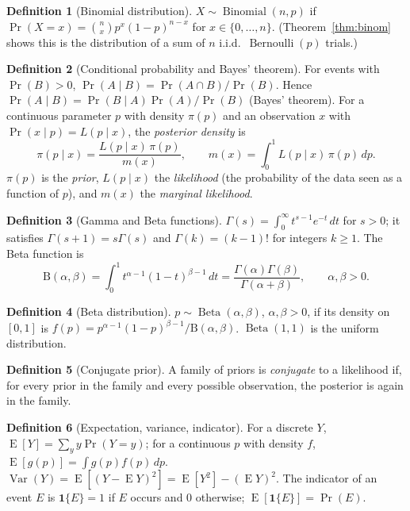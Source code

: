 \documentclass[11pt]{article}
\theoremstyle{definition}
\newtheorem{definition}{Definition}
\theoremstyle{remark}
\renewcommand{\Pr}{\operatorname{Pr}}
\newcommand{\E}{\operatorname{E}}
\newcommand{\Var}{\operatorname{Var}}
\newcommand{\Bin}{\operatorname{Binomial}}
\newcommand{\Ber}{\operatorname{Bernoulli}}
\newcommand{\Betad}{\operatorname{Beta}}
\newcommand{\Bfun}{\mathrm{B}}
\newcommand{\ind}[1]{\mathbf{1}\{#1\}}
\begin{document}
\begin{definition}[Binomial distribution]
$X\sim\Bin(n,p)$ if $\Pr(X=x)=\binom nx p^x(1-p)^{n-x}$ for $x\in\{0,\dots,n\}$.
(Theorem~\ref{thm:binom} shows this is the distribution of a sum of $n$ i.i.d.\ $\Ber(p)$ trials.)
\end{definition}

\begin{definition}[Conditional probability and Bayes' theorem]
For events with $\Pr(B)>0$, $\Pr(A\mid B)=\Pr(A\cap B)/\Pr(B)$. Hence
$\Pr(A\mid B)=\Pr(B\mid A)\Pr(A)/\Pr(B)$ (Bayes' theorem). For a continuous parameter $p$
with density $\pi(p)$ and an observation $x$ with $\Pr(x\mid p)=L(p\mid x)$, the
\emph{posterior density} is
\[
\pi(p\mid x)=\frac{L(p\mid x)\,\pi(p)}{m(x)},\qquad m(x)=\int_0^1 L(p\mid x)\,\pi(p)\,dp .
\]
$\pi(p)$ is the \emph{prior}, $L(p\mid x)$ the \emph{likelihood} (the probability of the data seen as a
function of $p$), and $m(x)$ the \emph{marginal likelihood}.
\end{definition}

\begin{definition}[Gamma and Beta functions]
$\Gamma(s)=\int_0^\infty t^{s-1}e^{-t}\,dt$ for $s>0$; it satisfies $\Gamma(s+1)=s\Gamma(s)$ and
$\Gamma(k)=(k-1)!$ for integers $k\ge1$. The Beta function is
\[
\Bfun(\alpha,\beta)=\int_0^1 t^{\alpha-1}(1-t)^{\beta-1}\,dt=\frac{\Gamma(\alpha)\Gamma(\beta)}{\Gamma(\alpha+\beta)},
\qquad \alpha,\beta>0 .
\]
\end{definition}

\begin{definition}[Beta distribution]
$p\sim\Betad(\alpha,\beta)$, $\alpha,\beta>0$, if its density on $[0,1]$ is
$f(p)=p^{\alpha-1}(1-p)^{\beta-1}/\Bfun(\alpha,\beta)$. $\Betad(1,1)$ is the uniform distribution.
\end{definition}

\begin{definition}[Conjugate prior]
A family of priors is \emph{conjugate} to a likelihood if, for every prior in the family and every
possible observation, the posterior is again in the family.
\end{definition}

\begin{definition}[Expectation, variance, indicator]
For a discrete $Y$, $\E[Y]=\sum_y y\Pr(Y=y)$; for a continuous $p$ with density $f$, $\E[g(p)]=\int g(p)f(p)\,dp$.
$\Var(Y)=\E[(Y-\E Y)^2]=\E[Y^2]-(\E Y)^2$. The indicator of an event $E$ is $\ind{E}=1$ if $E$
occurs and $0$ otherwise; $\E[\ind{E}]=\Pr(E)$.
\end{definition}
\end{document}
